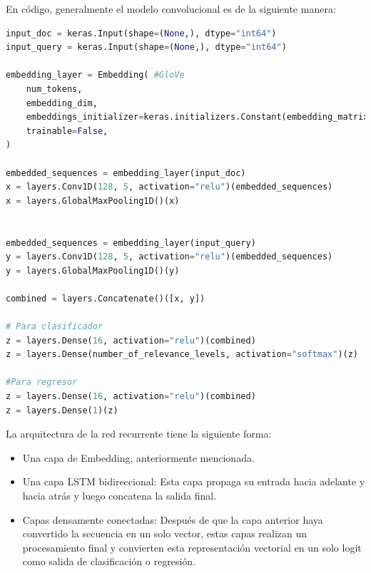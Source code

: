 \documentclass[12pt]{article}
\begin{document}
En c\'odigo, generalmente el modelo convolucional es de la siguiente manera:
	 \begin{lstlisting}[frame=single, breaklines, language=Python] 
input_doc = keras.Input(shape=(None,), dtype="int64")
input_query = keras.Input(shape=(None,), dtype="int64")

embedding_layer = Embedding( #GloVe
	num_tokens,
	embedding_dim,
	embeddings_initializer=keras.initializers.Constant(embedding_matrix),
	trainable=False,
)

embedded_sequences = embedding_layer(input_doc)
x = layers.Conv1D(128, 5, activation="relu")(embedded_sequences)
x = layers.GlobalMaxPooling1D()(x)


embedded_sequences = embedding_layer(input_query)
y = layers.Conv1D(128, 5, activation="relu")(embedded_sequences)
y = layers.GlobalMaxPooling1D()(y)

combined = layers.Concatenate()([x, y])

# Para clasificador
z = layers.Dense(16, activation="relu")(combined)
z = layers.Dense(number_of_relevance_levels, activation="softmax")(z)

#Para regresor
z = layers.Dense(16, activation="relu")(combined)
z = layers.Dense(1)(z) 

\end{lstlisting}

La arquitectura de la red recurrente tiene la siguiente forma:
\begin{itemize}
	\item Una capa de Embedding, anteriormente mencionada.
	\item Una capa LSTM bidireccional:  Esta capa propaga su entrada hacia adelante y hacia atrás y luego concatena la salida final.
	\item Capas densamente conectadas: Después de que la capa anterior haya convertido la secuencia en un solo vector, estas capas realizan un procesamiento final y convierten esta representación vectorial en un solo logit como salida de clasificación o regresi\'on.
\end{itemize}
\end{document}
